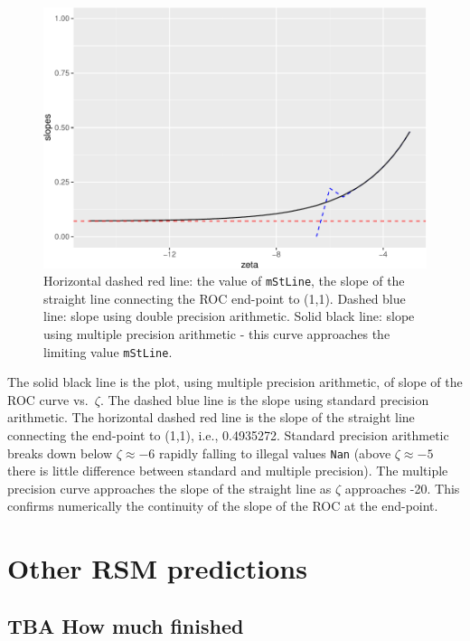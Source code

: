 \documentclass[
]{book}
\begin{document}
\begin{figure}
\centering
\includegraphics{07-rsm-predictions_files/figure-latex/rsm-predictions-plots1-1.pdf}
\caption{\label{fig:rsm-predictions-plots1}Horizontal dashed red line: the value of \texttt{mStLine}, the slope of the straight line connecting the ROC end-point to (1,1). Dashed blue line: slope using double precision arithmetic. Solid black line: slope using multiple precision arithmetic - this curve approaches the limiting value \texttt{mStLine}.}
\end{figure}

The solid black line is the plot, using multiple precision arithmetic, of slope of the ROC curve vs.~\(\zeta\). The dashed blue line is the slope using standard precision arithmetic. The horizontal dashed red line is the slope of the straight line connecting the end-point to (1,1), i.e., 0.4935272. Standard precision arithmetic breaks down below \(\zeta \approx -6\) rapidly falling to illegal values \texttt{Nan} (above \(\zeta \approx -5\) there is little difference between standard and multiple precision). The multiple precision curve approaches the slope of the straight line as \(\zeta\) approaches -20. This confirms numerically the continuity of the slope of the ROC at the end-point.

\hypertarget{rsm-other-predictions}{%
\chapter{Other RSM predictions}\label{rsm-other-predictions}}

\hypertarget{rsm-other-predictions-how-much-finished}{%
\section{TBA How much finished}\label{rsm-other-predictions-how-much-finished}}
\end{document}
